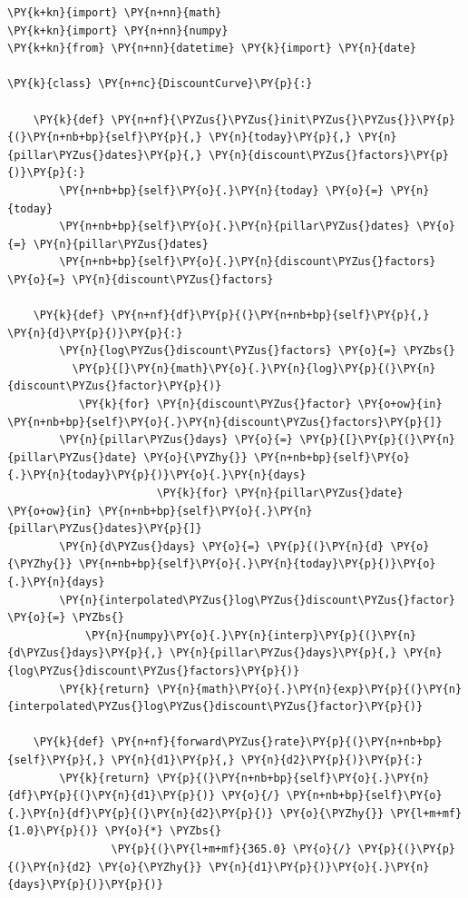 \begin{tcolorbox}[breakable, size=fbox, boxrule=1pt, pad at break*=1mm,colback=cellbackground, colframe=cellborder]
\begin{Verbatim}[commandchars=\\\{\}]
\PY{k+kn}{import} \PY{n+nn}{math}
\PY{k+kn}{import} \PY{n+nn}{numpy}
\PY{k+kn}{from} \PY{n+nn}{datetime} \PY{k}{import} \PY{n}{date}

\PY{k}{class} \PY{n+nc}{DiscountCurve}\PY{p}{:}

    \PY{k}{def} \PY{n+nf}{\PYZus{}\PYZus{}init\PYZus{}\PYZus{}}\PY{p}{(}\PY{n+nb+bp}{self}\PY{p}{,} \PY{n}{today}\PY{p}{,} \PY{n}{pillar\PYZus{}dates}\PY{p}{,} \PY{n}{discount\PYZus{}factors}\PY{p}{)}\PY{p}{:}
        \PY{n+nb+bp}{self}\PY{o}{.}\PY{n}{today} \PY{o}{=} \PY{n}{today}
        \PY{n+nb+bp}{self}\PY{o}{.}\PY{n}{pillar\PYZus{}dates} \PY{o}{=} \PY{n}{pillar\PYZus{}dates}
        \PY{n+nb+bp}{self}\PY{o}{.}\PY{n}{discount\PYZus{}factors} \PY{o}{=} \PY{n}{discount\PYZus{}factors}

    \PY{k}{def} \PY{n+nf}{df}\PY{p}{(}\PY{n+nb+bp}{self}\PY{p}{,} \PY{n}{d}\PY{p}{)}\PY{p}{:}
        \PY{n}{log\PYZus{}discount\PYZus{}factors} \PY{o}{=} \PYZbs{}
          \PY{p}{[}\PY{n}{math}\PY{o}{.}\PY{n}{log}\PY{p}{(}\PY{n}{discount\PYZus{}factor}\PY{p}{)} 
           \PY{k}{for} \PY{n}{discount\PYZus{}factor} \PY{o+ow}{in} \PY{n+nb+bp}{self}\PY{o}{.}\PY{n}{discount\PYZus{}factors}\PY{p}{]}
        \PY{n}{pillar\PYZus{}days} \PY{o}{=} \PY{p}{[}\PY{p}{(}\PY{n}{pillar\PYZus{}date} \PY{o}{\PYZhy{}} \PY{n+nb+bp}{self}\PY{o}{.}\PY{n}{today}\PY{p}{)}\PY{o}{.}\PY{n}{days} 
                       \PY{k}{for} \PY{n}{pillar\PYZus{}date} \PY{o+ow}{in} \PY{n+nb+bp}{self}\PY{o}{.}\PY{n}{pillar\PYZus{}dates}\PY{p}{]}
        \PY{n}{d\PYZus{}days} \PY{o}{=} \PY{p}{(}\PY{n}{d} \PY{o}{\PYZhy{}} \PY{n+nb+bp}{self}\PY{o}{.}\PY{n}{today}\PY{p}{)}\PY{o}{.}\PY{n}{days}
        \PY{n}{interpolated\PYZus{}log\PYZus{}discount\PYZus{}factor} \PY{o}{=} \PYZbs{}
            \PY{n}{numpy}\PY{o}{.}\PY{n}{interp}\PY{p}{(}\PY{n}{d\PYZus{}days}\PY{p}{,} \PY{n}{pillar\PYZus{}days}\PY{p}{,} \PY{n}{log\PYZus{}discount\PYZus{}factors}\PY{p}{)}
        \PY{k}{return} \PY{n}{math}\PY{o}{.}\PY{n}{exp}\PY{p}{(}\PY{n}{interpolated\PYZus{}log\PYZus{}discount\PYZus{}factor}\PY{p}{)}

    \PY{k}{def} \PY{n+nf}{forward\PYZus{}rate}\PY{p}{(}\PY{n+nb+bp}{self}\PY{p}{,} \PY{n}{d1}\PY{p}{,} \PY{n}{d2}\PY{p}{)}\PY{p}{:}
        \PY{k}{return} \PY{p}{(}\PY{n+nb+bp}{self}\PY{o}{.}\PY{n}{df}\PY{p}{(}\PY{n}{d1}\PY{p}{)} \PY{o}{/} \PY{n+nb+bp}{self}\PY{o}{.}\PY{n}{df}\PY{p}{(}\PY{n}{d2}\PY{p}{)} \PY{o}{\PYZhy{}} \PY{l+m+mf}{1.0}\PY{p}{)} \PY{o}{*} \PYZbs{}
                \PY{p}{(}\PY{l+m+mf}{365.0} \PY{o}{/} \PY{p}{(}\PY{p}{(}\PY{n}{d2} \PY{o}{\PYZhy{}} \PY{n}{d1}\PY{p}{)}\PY{o}{.}\PY{n}{days}\PY{p}{)}\PY{p}{)}
\end{Verbatim}
\end{tcolorbox}


